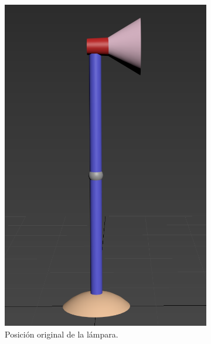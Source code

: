 \documentclass{article}
\begin{document}
 \begin{figure}[H]
     \centering 
 	\begin{subfigure}[H]{0.38\textwidth}
 	    \centering
\includegraphics[width=\textwidth]{imagenes/lamp1.png}
\caption{Posición original de la lámpara.}
     \end{subfigure}
     \hfill
 	\begin{subfigure}[H]{0.38\textwidth}
 	    \centering

\end{subfigure}
\end{figure}
\end{document}
